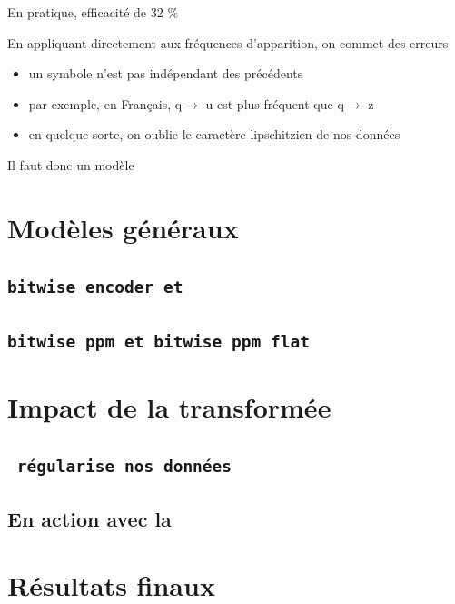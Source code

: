 \documentclass{beamer}
\newcommand{\tech}[1]{\tt{#1}}
\newcommand{\relief}[1]{{\color{structureTextColor} #1}}
\newcommand{\blue}[1]{{\color{regularblue} #1}}
\theoremstyle{theoreme}
\begin{document}
\begin{frame}
  \frametitle{\secname{}}
  \framesubtitle{\subsecname{}}
  En pratique, efficacité de \relief{32 \%}
  \pause

  \bigskip

  En appliquant directement  aux \relief{fréquences} d'apparition,
  on commet des erreurs
  \begin{itemize}
    \item\pause un symbole n'est pas \relief{indépendant} des précédents
    \item\pause par exemple, en Français, q$\to$\blue{u} est plus fréquent que q$\to$\blue{z}
    \item\pause en quelque sorte, on oublie le caractère \relief{lipschitzien} de nos données
  \end{itemize}
  \pause

  \relief{Il faut donc un modèle}

\end{frame}

\section{Modèles généraux}
\subsection{\tech{bitwise encoder} et \tech{}}
\subsection{\tech{bitwise ppm} et \tech{bitwise ppm flat}}

\section{Impact de la transformée}
\subsection{\tech{} régularise nos données}
\subsection{En action avec la \tech{}}

\section{Résultats finaux}
\end{document}
